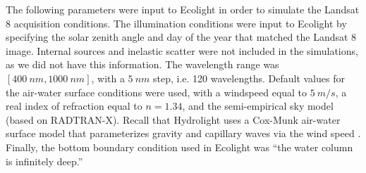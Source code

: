 \documentclass[onecolumn,3p,letterpaper]{elsarticle}
\begin{document}
The following parameters were input to Ecolight in order to simulate the Landsat 8 acquisition conditions. The illumination conditions were input to Ecolight by specifying the solar zenith angle and day of the year that matched the Landsat 8 image. Internal sources and inelastic scatter were not included in the simulations, as we did not have this information. The wavelength range was $[400~nm,1000~nm]$, with a $5~nm$ step, i.e. 120 wavelengths. Default values for the air-water surface conditions were used, with a windspeed equal to $5~m/s$, a real index of refraction equal to $n=1.34$, and the semi-empirical sky model (based on RADTRAN-X). Recall that Hydrolight uses a Cox-Munk air-water surface model that parameterizes gravity and capillary waves via the wind speed \citep{MobleyHEtech}. Finally, the bottom boundary condition used in Ecolight was ``the water column is infinitely deep.''
\end{document}
